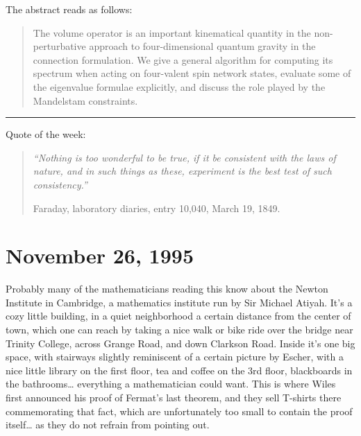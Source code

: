 \documentclass{article}
\def\tightlist{}
\renewcommand{\texttt}[1]{%
  \begingroup
  \ttfamily
  \begingroup\lccode`~=`/\lowercase{\endgroup\def~}{/\discretionary{}{}{}}%
  \begingroup\lccode`~=`[\lowercase{\endgroup\def~}{[\discretionary{}{}{}}%
  \begingroup\lccode`~=`.\lowercase{\endgroup\def~}{.\discretionary{}{}{}}%
  \catcode`/=\active\catcode`[=\active\catcode`.=\active
  \scantokens{#1\noexpand}%
  \endgroup
}
\begin{document}

The abstract reads as follows:

\begin{quote}
The volume operator is an important kinematical quantity in the
non-perturbative approach to four-dimensional quantum gravity in the
connection formulation. We give a general algorithm for computing its
spectrum when acting on four-valent spin network states, evaluate some
of the eigenvalue formulae explicitly, and discuss the role played by
the Mandelstam constraints.
\end{quote}

\begin{center}\rule{0.5\linewidth}{0.5pt}\end{center}

Quote of the week:

\begin{quote}
\emph{``Nothing is too wonderful to be true, if it be consistent with
the laws of nature, and in such things as these, experiment is the best
test of such consistency.''}

Faraday, laboratory diaries, entry 10,040, March 19, 1849.
\end{quote}
\hypertarget{week70}{%
\section{November 26, 1995}\label{week70}}

Probably many of the mathematicians reading this know about the Newton
Institute in Cambridge, a mathematics institute run by Sir Michael
Atiyah. It's a cozy little building, in a quiet neighborhood a certain
distance from the center of town, which one can reach by taking a nice
walk or bike ride over the bridge near Trinity College, across Grange
Road, and down Clarkson Road. Inside it's one big space, with stairways
slightly reminiscent of a certain picture by Escher, with a nice little
library on the first floor, tea and coffee on the 3rd floor, blackboards
in the bathrooms\ldots{} everything a mathematician could want. This is
where Wiles first announced his proof of Fermat's last theorem, and they
sell T-shirts there commemorating that fact, which are unfortunately too
small to contain the proof itself\ldots{} as they do not refrain from
pointing out.
\end{document}
